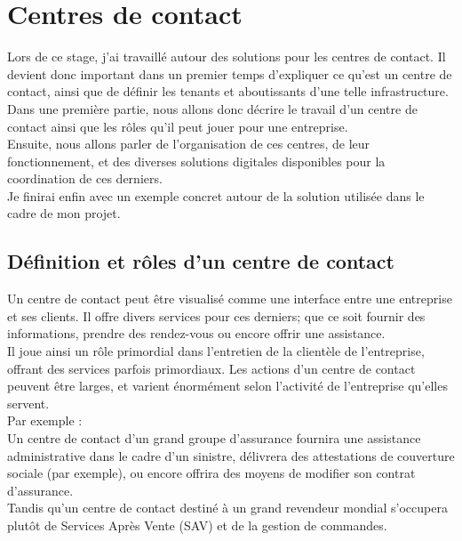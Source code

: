 \documentclass{rapport}
\begin{document}
\newpage

\section{Centres de contact}

Lors de ce stage, j'ai travaillé autour des solutions pour les centres de contact. Il devient donc important dans un premier temps d'expliquer ce qu'est un centre de contact, ainsi que de définir les tenants et aboutissants d'une telle infrastructure.\\
Dans une première partie, nous allons donc décrire le travail d'un centre de contact ainsi que les rôles qu'il peut jouer pour une entreprise.\\
Ensuite, nous allons parler de l'organisation de ces centres, de leur fonctionnement, et des diverses solutions digitales disponibles pour la coordination de ces derniers.\\
Je finirai enfin avec un exemple concret autour de la solution utilisée dans le cadre de mon projet.

\subsection{Définition et rôles d'un centre de contact}

Un centre de contact peut être visualisé comme une interface entre une entreprise et ses clients. Il offre divers services pour ces derniers; que ce soit fournir des informations, prendre des rendez-vous ou encore offrir une assistance.\\

Il joue ainsi un rôle primordial dans l'entretien de la clientèle de l'entreprise, offrant des services parfois primordiaux.
Les actions d'un centre de contact peuvent être larges, et varient énormément selon l'activité de l'entreprise qu'elles servent.\\

Par exemple :\\
Un centre de contact d'un grand groupe d'assurance fournira une assistance administrative dans le cadre d'un sinistre, délivrera des attestations de couverture sociale (par exemple), ou encore offrira des moyens de modifier son contrat d'assurance.\\
Tandis qu'un centre de contact destiné à un grand revendeur mondial s'occupera plutôt de Services Après Vente (SAV) et de la gestion de commandes.\\
\end{document}
